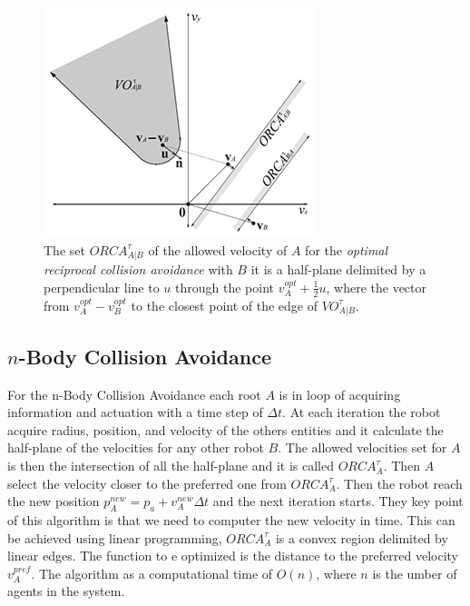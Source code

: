 \documentclass[11pt,twocolumn]{article}
\begin{document}
\begin{figure}

\centering

\includegraphics[scale=0.7]{ORCA-1.png}

\caption{The set $\mathit{ORCA}^\tau_{A|B}$ of the allowed velocity of  $A$ for the \textit{optimal reciprocal collision avoidance} with $B$ it is a half-plane delimited by a perpendicular line to $u$  through the point $v^{opt}_A+\frac{1}{2}u$, where the vector from $v^{opt}_A - v^{opt}_B$ to the closest point of the edge of $\mathit{VO}^\tau_{A|B}$.}\label{fig:3}

\end{figure}

\subsection{$n$-Body Collision Avoidance}
For the n-Body Collision Avoidance each root $A$ is in loop of acquiring information and actuation with a time step of $\Delta t$. At each iteration the robot acquire radius, position, and velocity of the others entities and it calculate the half-plane of the velocities for any other robot $B$. The allowed velocities set for $A$ is then the intersection of all the half-plane and it is called $\mathit{ORCA}^\tau_A$. Then $A$ select the velocity closer to the preferred one from $\mathit{ORCA}^\tau_A$. Then the robot reach the new position $p^{new}_A = p_a + v_A^{new}\Delta t$ and the next iteration starts.
They key point of this algorithm is that we need to computer the new velocity in time. This can be achieved using linear programming,  $\mathit{ORCA}^\tau_A$ is a convex region delimited by linear edges. The function to e optimized is the distance to the preferred velocity $v^{pref}_A$. The algorithm as a computational time of $O(n)$, where $n$ is the umber of agents in the system. 
\end{document}
